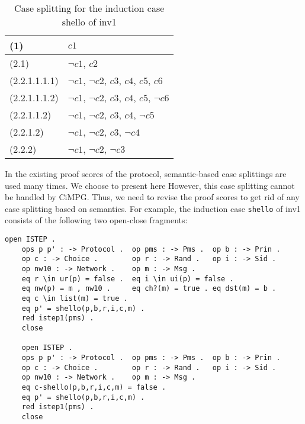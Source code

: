 \documentclass[a4paper,fleqn]{cas-dc}
\begin{document}
\noindent
\begin{table}[t]
	\begin{tabular}{l|l}
		\hline
		(1)           & $c1$                                                                     \\ \hline
		(2.1)         & $\neg c1$, $c2$                                                       \\ \hline
		(2.2.1.1.1.1) & $\neg c1$, $\neg c2$, $c3$, $c4$, $c5$, $c6$  \\ \hline
		(2.2.1.1.1.2) & $\neg c1$, $\neg c2$, $c3$, $c4$, $c5$, $\neg c6$ \\ \hline
		(2.2.1.1.2)   & $\neg c1$, $\neg c2$, $c3$, $c4$, $\neg c5$              \\ \hline
		(2.2.1.2)     & $\neg c1$, $\neg c2$, $c3$, $\neg c4$                           \\ \hline
		(2.2.2)       & $\neg c1$, $\neg c2$, $\neg c3$                                        \\ \hline
	\end{tabular}
	\caption{Case splitting for the induction case shello of inv1}
	\label{fig-cs-inv1}
\end{table}


In the existing proof scores of the protocol, semantic-based case splittings are used many times.
We choose to present here  
However, this case splitting cannot be handled by CiMPG. Thus, we need to revise the proof scores to get rid of any case splitting based on semantics. 
For example, the induction case \verb!shello! of inv1 consists of the following two open-close fragments:

 \begin{small}
\begin{verbatim}
open ISTEP .
	ops p p' : -> Protocol .  op pms : -> Pms .  op b : -> Prin .
	op c : -> Choice .        op r : -> Rand .   op i : -> Sid . 
	op nw10 : -> Network .    op m : -> Msg .           
	eq r \in ur(p) = false .  eq i \in ui(p) = false .
	eq nw(p) = m , nw10 .     eq ch?(m) = true . eq dst(m) = b .
	eq c \in list(m) = true . 
	eq p' = shello(p,b,r,i,c,m) .
	red istep1(pms) .
	close
	
	open ISTEP .
	ops p p' : -> Protocol .  op pms : -> Pms .  op b : -> Prin .
	op c : -> Choice .        op r : -> Rand .   op i : -> Sid . 
	op nw10 : -> Network .    op m : -> Msg .           
	eq c-shello(p,b,r,i,c,m) = false . 
	eq p' = shello(p,b,r,i,c,m) .
	red istep1(pms) .
	close
\end{verbatim}
 \end{small}
\end{document}
